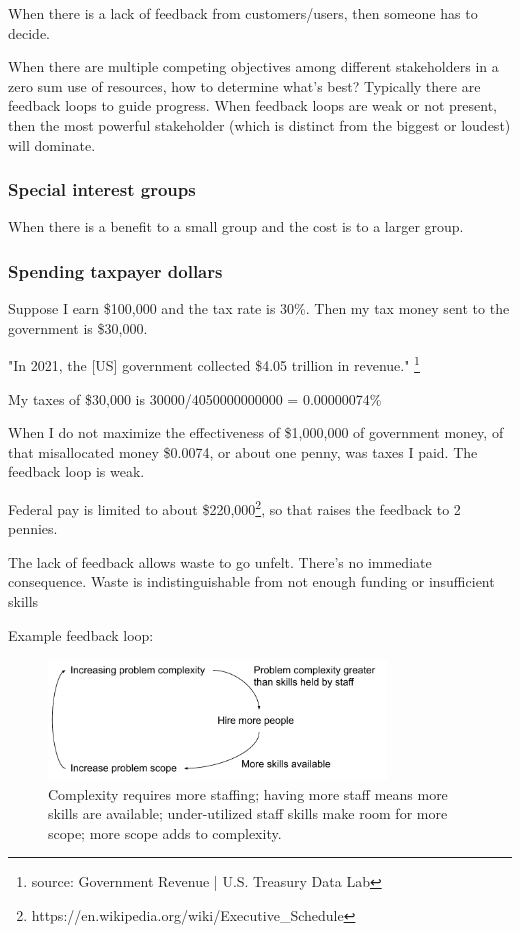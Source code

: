 
When there is a lack of feedback from customers/users, then someone has to decide.


When there are multiple competing objectives among different stakeholders in a zero sum use of resources, how to determine what's best? Typically there are feedback loops to guide progress. When feedback loops are weak or not present, then the most powerful stakeholder (which is distinct from the biggest or loudest) will dominate. 

\subsubsection{Special interest groups}

When there is a benefit to a small group and the cost is to a larger group.

\subsubsection{Spending taxpayer dollars}

Suppose I earn \$100,000 and the tax rate is 30\%. Then my tax money sent to the government is \$30,000.

"In 2021, the [US] government collected \$4.05 trillion in revenue."
\footnote{source: Government Revenue | U.S. Treasury Data Lab}

My taxes of \$30,000 is
30000/4050000000000 = 0.00000074\%

When I do not maximize the effectiveness of \$1,000,000 of government money, of that misallocated money \$0.0074, or about one penny, was taxes I paid. The feedback loop is weak.

Federal pay is limited to about \$220,000\footnote{https://en.wikipedia.org/wiki/Executive\_Schedule}, so that raises the feedback to 2 pennies.

The lack of feedback allows waste to go unfelt. There's no immediate consequence.
Waste is indistinguishable from not enough funding or insufficient skills 




Example feedback loop:
\begin{center}
\begin{figure}[ht]
    \centering
    \includegraphics[width=0.8\textwidth]{images/feedback_loop_complexity_and_staffing}
    \caption{Complexity requires more staffing; having more staff means more skills are available; under-utilized staff skills make room for more scope; more scope adds to complexity.}
    \label{fig:complexity_and_staff_growth}
\end{figure}
\end{center}

